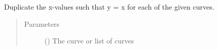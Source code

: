 \documentclass[letterpaper,10pt,english]{sphinxmanual}
\begin{document}
\begin{fulllineitems}
\label{\detokenize{pydv:pydvpy.dupx}}
Duplicate the x-values such that y = x for each of the given curves.

\begin{sphinxVerbatim}[commandchars=\\\{\}]
  
\end{sphinxVerbatim}

\begin{sphinxVerbatim}[commandchars=\\\{\}]
\end{sphinxVerbatim}

\begin{sphinxVerbatim}[commandchars=\\\{\}]
 
\end{sphinxVerbatim}
\begin{quote}\begin{description}
\item[{Parameters}] \leavevmode
{} ({\hyperref[\detokenize{pydv:curve.Curve}]{}}) \textendash{} The curve or list of curves

\end{description}\end{quote}

\end{fulllineitems}

\end{document}
